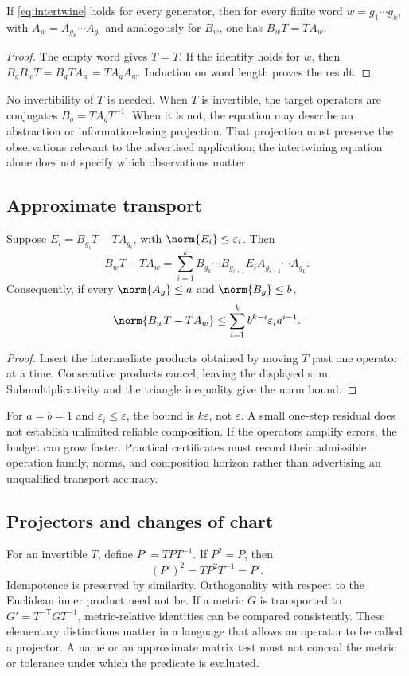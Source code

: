 \documentclass[11pt]{article}
\begin{document}
\begin{proposition}\label{prop:transport}
If \eqref{eq:intertwine} holds for every generator, then for every finite word \(w=g_1\cdots g_k\), with \(A_w=A_{g_k}\cdots A_{g_1}\) and analogously for \(B_w\), one has \(B_wT=TA_w\).
\end{proposition}
\begin{proof}
The empty word gives \(T=T\). If the identity holds for \(w\), then
\(B_gB_wT=B_gTA_w=TA_gA_w\). Induction on word length proves the result.
\end{proof}
No invertibility of \(T\) is needed. When \(T\) is invertible, the target operators are conjugates \(B_g=TA_gT^{-1}\). When it is not, the equation may describe an abstraction or information-losing projection. That projection must preserve the observations relevant to the advertised application; the intertwining equation alone does not specify which observations matter.

\subsection{Approximate transport}
\begin{proposition}\label{prop:approx}
Suppose \(E_i=B_{g_i}T-TA_{g_i}\), with \(\norm{E_i}\le\varepsilon_i\). Then
\[
 B_wT-TA_w=\sum_{i=1}^{k}B_{g_k}\cdots B_{g_{i+1}}E_iA_{g_{i-1}}\cdots A_{g_1}.
\]
Consequently, if every \(\norm{A_g}\le a\) and \(\norm{B_g}\le b\),
\[
 \norm{B_wT-TA_w}\le\sum_{i=1}^{k} b^{k-i}\varepsilon_i a^{i-1}.
\]
\end{proposition}
\begin{proof}
Insert the intermediate products obtained by moving \(T\) past one operator at a time. Consecutive products cancel, leaving the displayed sum. Submultiplicativity and the triangle inequality give the norm bound.
\end{proof}
For \(a=b=1\) and \(\varepsilon_i\le\varepsilon\), the bound is \(k\varepsilon\), not \(\varepsilon\). A small one-step residual does not establish unlimited reliable composition. If the operators amplify errors, the budget can grow faster. Practical certificates must record their admissible operation family, norms, and composition horizon rather than advertising an unqualified transport accuracy.

\subsection{Projectors and changes of chart}
For an invertible \(T\), define \(P'=TPT^{-1}\). If \(P^2=P\), then
\[
 (P')^2=TP^2T^{-1}=P'.
\]
Idempotence is preserved by similarity. Orthogonality with respect to the Euclidean inner product need not be. If a metric \(G\) is transported to \(G'=T^{-\mathsf T}GT^{-1}\), metric-relative identities can be compared consistently. These elementary distinctions matter in a language that allows an operator to be called a projector. A name or an approximate matrix test must not conceal the metric or tolerance under which the predicate is evaluated.
\end{document}
